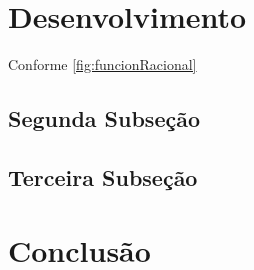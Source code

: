 \documentclass[a4paper, 11pt, twoside, ]{article}
\begin{document}
\begin{multicols}{2}
	\section{Desenvolvimento}
	\lipsum[1-2] Conforme \autoref{fig:funcionRacional}
	\begin{minipage}{\linewidth}
		\vspace{10pt}
		\centering
		\begin{tikzpicture}
			
		\end{tikzpicture}
		\captionsetup{type=figure}
  \label{fig:funcionRacional}
	\vspace{10pt}
	\end{minipage}

	\lipsum[4-5]
	\subsection{Segunda Subseção}
	\lipsum[6-7]\cite{CARRON:1997}
	\subsection{Terceira Subseção}
	\lipsum[10-11]\cite{ZEICHNER:1993}

	\section{Conclusão}
	\lipsum[8-9]
	\columnbreak

	
	
\end{multicols}
\end{document}

